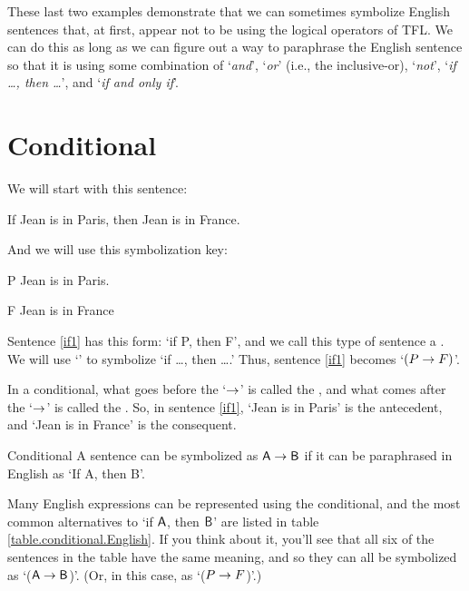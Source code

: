These last two examples demonstrate that we can sometimes symbolize English sentences that, at first, appear not to be using the logical operators of TFL. We can do this as long as we can figure out a way to paraphrase the English sentence so that it is using some combination of `\textit{and}', `\textit{or}' (i.e., the inclusive-or), `\textit{not}', `\textit{if \ldots, then \ldots}', and `\textit{if and only if}'. 


\section{Conditional}

We will start with this sentence:
	\begin{earg}
		\item[\ex{if1}] If Jean is in Paris, then Jean is in France.
	\end{earg}
And we will use this symbolization key:
	\begin{ekey}
		\item[P] Jean is in Paris.
		\item[F] Jean is in France
	\end{ekey}
Sentence \ref{if1} has this form: `if P, then F', and we call this type of sentence a . We will use `\eif' to symbolize `if \ldots, then \ldots.' Thus, sentence \ref{if1} becomes `$(P\rightarrow F)$'. 

In a conditional, what goes before the `$\rightarrow$'  is called the , and what comes after the `$\rightarrow$' is called the . So, in sentence \ref{if1}, `Jean is in Paris' is the antecedent, and `Jean is in France' is the consequent.

\begin{factboxy}{Conditional}
A sentence can be symbolized as $\mathsf{A} \rightarrow \mathsf{B}$ if it can be paraphrased in English as `If A, then B'.
\end{factboxy}

Many English expressions can be represented using the conditional, and the most common alternatives to `if $\mathsf{A}$, then $\mathsf{B}$' are listed in table \ref{table.conditional.English}. If you think about it, you'll see that all six of the sentences in the table have the same meaning, and so they can all be symbolized as `($\mathsf{A} \rightarrow \mathsf{B}$)'. (Or, in this case, as `($P \rightarrow F$)'.)


